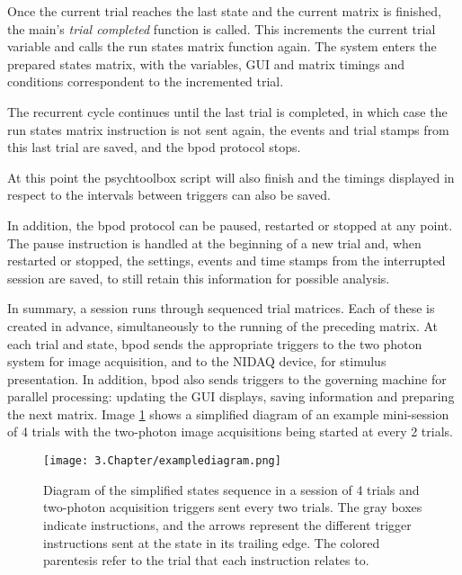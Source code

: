 Once the current trial reaches the last state and the current matrix is finished, the main's \textit{trial completed} function is called. This increments the current trial variable and calls the run states matrix function again. The system enters the prepared states matrix, with the variables, GUI and matrix timings and conditions correspondent to the incremented trial.

The recurrent cycle continues until the last trial is completed, in which case the run states matrix instruction is not sent again, the events and trial stamps from this last trial are saved, and the bpod protocol stops. 

At this point the psychtoolbox script will also finish and the timings displayed in respect to the intervals between triggers can also be saved.

In addition, the bpod protocol can be paused, restarted or stopped at any point. The pause instruction is handled at the beginning of a new trial and, when restarted or stopped, the settings, events and time stamps from the interrupted session are saved, to still retain this information for possible analysis.

In summary, a session runs through sequenced trial matrices. Each of these is created in advance, simultaneously to the running of the preceding matrix. At each trial and state, bpod sends the appropriate triggers to the two photon system for image acquisition, and to the NIDAQ device, for stimulus presentation. In addition, bpod also sends triggers to the governing machine for parallel processing: updating the GUI displays, saving information and preparing the next matrix. Image \ref{fig:examplediagram} shows a simplified diagram of an example mini-session of 4 trials with the two-photon image acquisitions being started at every 2 trials.

\begin{figure}[H]
	\centering
		\texttt{[image: 3.Chapter/examplediagram.png]}
	\caption[c1]{Diagram of the simplified states sequence in a session of 4 trials and two-photon acquisition triggers sent every two trials. The gray boxes indicate instructions, and the arrows represent the different trigger instructions sent at the state in its trailing edge. The colored parentesis refer to the trial that each instruction relates to. \label{fig:examplediagram}}
	
\end{figure}